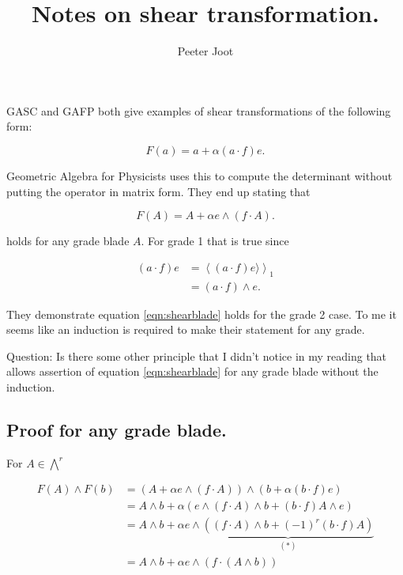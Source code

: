 \documentclass{article}      %
\title{ Notes on shear transformation. } %
\author{Peeter Joot}         %
\newcommand{\gpgrade}[2] {{\left\langle{{#1}}\right\rangle}_{#2}}
\begin{document}

\maketitle{}

\section{}

GASC and GAFP both give examples of shear transformations of the following
form:

\[
F(a) = a + \alpha(a \cdot f) e.
\]

Geometric Algebra for Physicists uses this to compute the determinant without putting the operator in matrix form.  They end up stating that 

\begin{equation}\label{eqn:shearblade}
F(A) = A + \alpha e \wedge (f \cdot A).
\end{equation}

holds for any grade blade $A$.  For grade 1 that is true since

\begin{align*}
(a \cdot f) e 
&= \gpgrade{(a \cdot f) e \rangle}{1} \\
&= (a \cdot f) \wedge e.
\end{align*}

They demonstrate equation \ref{eqn:shearblade}
holds for the grade 2 case.  To me it seems
like an induction is required to make their statement for any grade.

Question: Is there some other principle that I didn't notice in my reading that allows assertion of 
equation \ref{eqn:shearblade}
for any grade blade without the induction.

\subsection{ Proof for any grade blade. }

For $A \in {\bigwedge}^r$

\begin{align*}
F(A) \wedge F(b)
&= \left(A + \alpha e \wedge (f \cdot A)\right) \wedge
   \left(b + \alpha(b \cdot f) e \right) \\
&= A \wedge b
 + \alpha 
\left(
e \wedge (f \cdot A) \wedge b
+ (b \cdot f) A \wedge e 
\right) \\
&= A \wedge b
 + \alpha e \wedge
\underbrace{
\left(
(f \cdot A) \wedge b
+ (-1)^r (b \cdot f) A 
\right)
}_{(*)} \\
&= A \wedge b + \alpha e \wedge (f \cdot (A \wedge b))
\end{align*}
\end{document}

